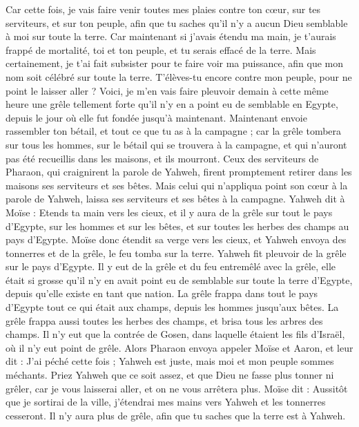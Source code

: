 \begin{multicols}{2}
Car cette fois, je vais faire venir toutes mes plaies contre ton cœur, sur tes serviteurs, et sur ton peuple, afin que tu saches qu'il n'y a aucun Dieu semblable à moi sur toute la terre.
Car maintenant si j'avais étendu ma main, je t'aurais frappé de mortalité, toi et ton peuple, et tu serais effacé de la terre.
Mais certainement, je t'ai fait subsister pour te faire voir ma puissance, afin que mon nom soit célébré sur toute la terre.
T'élèves-tu encore contre mon peuple, pour ne point le laisser aller ?
Voici, je m'en vais faire pleuvoir demain à cette même heure une grêle tellement forte qu’il n'y en a point eu de semblable en Egypte, depuis le jour où elle fut fondée jusqu’à maintenant.
Maintenant envoie rassembler ton bétail, et tout ce que tu as à la campagne ; car la grêle tombera sur tous les hommes, sur le bétail qui se trouvera à la campagne, et qui n’auront pas été recueillis dans les maisons, et ils mourront.
Ceux des serviteurs de Pharaon, qui craignirent la parole de Yahweh, firent promptement retirer dans les maisons ses serviteurs et ses bêtes.
Mais celui qui n'appliqua point son cœur à la parole de Yahweh, laissa ses serviteurs et ses bêtes à la campagne.
Yahweh dit à Moïse : Etends ta main vers les cieux, et il y aura de la grêle sur tout le pays d'Egypte, sur les hommes et sur les bêtes, et sur toutes les herbes des champs au pays d'Egypte.
Moïse donc étendit sa verge vers les cieux, et Yahweh envoya des tonnerres et de la grêle, le feu tomba sur la terre. Yahweh fit pleuvoir de la grêle sur le pays d'Egypte.
Il y eut de la grêle et du feu entremêlé avec la grêle, elle était si grosse qu'il n'y en avait point eu de semblable sur toute la terre d'Egypte, depuis qu'elle existe en tant que nation.
La grêle frappa dans tout le pays d'Egypte tout ce qui était aux champs, depuis les hommes jusqu'aux bêtes. La grêle frappa aussi toutes les herbes des champs, et brisa tous les arbres des champs.
Il n'y eut que la contrée de Gosen, dans laquelle étaient les fils d'Israël, où il n'y eut point de grêle.
Alors Pharaon envoya appeler Moïse et Aaron, et leur dit : J'ai péché cette fois ; Yahweh est juste, mais moi et mon peuple sommes méchants.
Priez Yahweh que ce soit assez, et que Dieu ne fasse plus tonner ni grêler, car je vous laisserai aller, et on ne vous arrêtera plus.
Moïse dit : Aussitôt que je sortirai de la ville, j'étendrai mes mains vers Yahweh et les tonnerres cesseront. Il n'y aura plus de grêle, afin que tu saches que la terre est à Yahweh.

\end{multicols}
